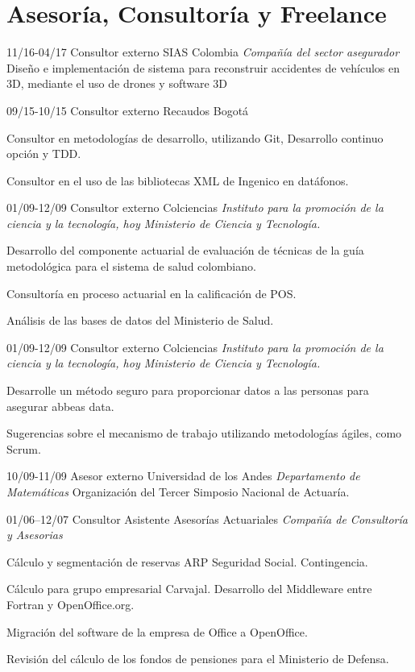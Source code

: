 \section{Asesoría, Consultoría y Freelance}
\begin{entrylist}

  \entry
	{11/16-04/17}
	{Consultor externo}
	{SIAS Colombia {\sl Compañía del sector asegurador}}
	{Diseño e implementación de sistema para reconstruir accidentes de vehículos en 3D,
	mediante el uso de drones y software 3D}

  \entry
	{09/15-10/15}
	{Consultor externo}
	{Recaudos Bogotá}
        {Consultor en metodologías de desarrollo, utilizando Git, Desarrollo continuo
opción y TDD.

	Consultor en el uso de las bibliotecas XML de Ingenico en datáfonos.}

\end{entrylist}

\newpage
\begin{entrylist}
  \entry
	{01/09-12/09}
	{Consultor externo}
	{Colciencias {\sl Instituto para la promoción de la ciencia y la tecnología, hoy Ministerio de Ciencia y Tecnología.}}
{Desarrollo del componente actuarial de evaluación de técnicas de la guía metodológica para
el sistema de salud colombiano.

Consultoría en proceso actuarial en la calificación de POS.

	Análisis de las bases de datos del Ministerio de Salud.}

  \entry
	{01/09-12/09}
	{Consultor externo}
	{Colciencias {\sl Instituto para la promoción de la ciencia y la tecnología, hoy Ministerio de Ciencia y Tecnología.}}
        {Desarrolle un método seguro para proporcionar datos a las personas para asegurar abbeas data.

	Sugerencias sobre el mecanismo de trabajo utilizando metodologías ágiles, como Scrum.}

  \entry
	{10/09-11/09}
	{Asesor externo}
	{Universidad de los Andes {\sl Departamento de Matemáticas}}
	{Organización del Tercer Simposio Nacional de Actuaría.}

  \entry
	{01/06–12/07}
	{Consultor Asistente}
	{Asesorías Actuariales {\sl Compañía de Consultoría y Asesorias}}
	{Cálculo y segmentación de reservas ARP Seguridad Social. Contingencia.

Cálculo para grupo empresarial Carvajal. Desarrollo del Middleware
entre Fortran y OpenOffice.org.

Migración del software de la empresa de Office a OpenOffice.

Revisión del cálculo de los fondos de pensiones para el Ministerio de
Defensa.}

\end{entrylist}
